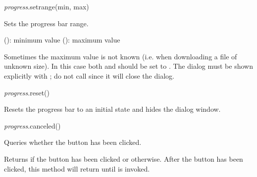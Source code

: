 \documentclass[a4paper,12pt,twoside,extrafontsizes]{memoir}
\begin{document}

\begin{luafuncprototype}
\emph{progress}.setrange(min, max)
\end{luafuncprototype}

\begin{funcdescr}
	Sets the progress bar range.
\end{funcdescr}

\begin{funcparams}
	 (): minimum value
	 (): maximum value
\end{funcparams}

\begin{funcremarks}
	Sometimes the maximum value is not known (i.e. when downloading a file of unknown size). In this case both  and  should be set to . The dialog must be shown explicitly with ; do not call  since it will close the dialog.
\end{funcremarks}


\begin{luafuncprototype}
\emph{progress}.reset()
\end{luafuncprototype}

\begin{funcdescr}
	Resets the progress bar to an initial state and hides the dialog window.
\end{funcdescr}


\begin{luafuncprototype}
\emph{progress}.canceled()
\end{luafuncprototype}

\begin{funcdescr}
	Queries whether the  button has been clicked.
\end{funcdescr}

\begin{funcret}
	Returns  if the  button has been clicked or  otherwise. After the  button has been clicked, this method will return  until  is invoked.
\end{funcret}
\end{document}
